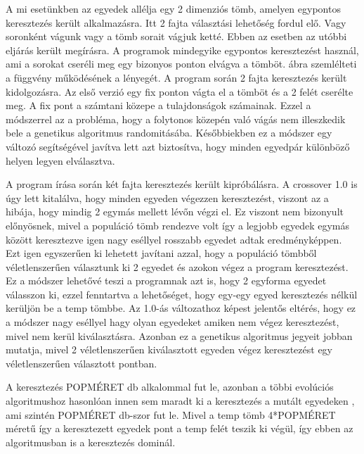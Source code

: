 \documentclass[12ppt,a4paper,oneside]{report}
\begin{document}
            {A mi esetünkben az egyedek allélja egy 2 dimenziós tömb, amelyen egypontos keresztezés került alkalmazásra. Itt 2 fajta választási lehetőség fordul elő. Vagy soronként vágunk vagy a tömb sorait vágjuk ketté. Ebben az esetben az utóbbi eljárás került megírásra. A programok mindegyike egypontos keresztezést használ, ami a sorokat cseréli meg egy bizonyos ponton elvágva a tömböt.  ábra szemlélteti a függvény működésének a lényegét. A program során 2 fajta keresztezés került kidolgozásra. Az első verzió egy fix ponton vágta el a tömböt és a 2 felét cserélte meg. A fix pont a számtani közepe a tulajdonságok számainak. Ezzel a módszerrel az a probléma, hogy a folytonos közepén való vágás nem illeszkedik bele a genetikus algoritmus randomitásába. Későbbiekben ez a módszer egy változó segítségével javítva lett azt biztosítva, hogy minden egyedpár különböző helyen legyen elválasztva.}
            
                     
            {A program írása során két fajta keresztezés került kipróbálásra. A crossover 1.0 is úgy lett kitalálva, hogy minden egyeden végezzen keresztezést, viszont az a hibája, hogy mindig 2 egymás mellett lévőn végzi el. Ez viszont nem bizonyult előnyösnek, mivel a populáció tömb rendezve volt így a legjobb egyedek egymás között keresztezve igen nagy eséllyel rosszabb egyedet adtak eredményképpen. Ezt igen egyszerűen ki lehetett javítani azzal, hogy a populáció tömbből véletlenszerűen választunk ki 2 egyedet és azokon végez a program keresztezést. Ez a módszer lehetővé teszi a programnak azt is, hogy 2 egyforma egyedet válasszon ki, ezzel fenntartva a lehetőséget, hogy egy-egy egyed keresztezés nélkül kerüljön be a temp tömbbe. Az 1.0-ás változathoz képest jelentős eltérés, hogy ez a módszer nagy eséllyel hagy olyan egyedeket amiken nem végez keresztezést, mivel nem kerül kiválasztásra. Azonban ez a genetikus algoritmus jegyeit jobban mutatja, mivel 2 véletlenszerűen kiválasztott egyeden végez keresztezést egy véletlenszerűen választott pontban.}
            
            
            {A keresztezés POPMÉRET db alkalommal fut le, azonban a többi evolúciós algoritmushoz hasonlóan innen sem maradt ki a keresztezés a mutált egyedeken , ami szintén POPMÉRET db-szor fut le. Mivel a temp tömb 4*POPMÉRET méretű így a keresztezett egyedek pont a temp felét teszik ki végül, így ebben az algoritmusban is a keresztezés dominál.}
\end{document}
